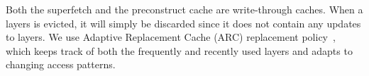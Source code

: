 Both the superfetch and the preconstruct cache are write-through caches.
When a layers is evicted, it will simply be discarded since it does not contain any
updates to layers.
%
We use Adaptive Replacement Cache (ARC) replacement policy~\cite{megiddo2003arc}, which keeps track of both the frequently and recently used layers and adapts to changing access patterns.
%


%
%


